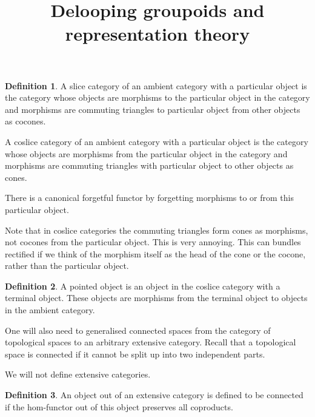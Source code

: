 \documentclass[10pt]{article}
\theoremstyle{plain}%
\theoremstyle{definition}
\newtheorem{definition}{Definition}[section]
\theoremstyle{remark}
\begin{document}
\title{Delooping groupoids and representation theory}

\maketitle

\begin{definition}
	A slice category of an ambient category with a particular object is the category whose objects are morphisms to the particular object in the category and morphisms are commuting triangles to particular object from other objects as cocones.

	A coslice category of an ambient category with a particular object is the category whose objects are morphisms from the particular object in the category and morphisms are commuting triangles with particular object to other objects as cones.

	There is a canonical forgetful functor by forgetting morphisms to or from this particular object.
\end{definition}

Note that in coslice categories the commuting triangles form cones as morphisms, not cocones from the particular object. This is very annoying.
This can bundles rectified if we think of the morphism itself as the head of the cone or the cocone, rather than the particular object.

\begin{definition}
	A pointed object is an object in the coslice category with a terminal object. These objects are morphisms from the terminal object to objects in the ambient category.
\end{definition}

One will also need to generalised connected spaces from the category of topological spaces to an arbitrary extensive category. Recall that a topological space is connected if it cannot be split up into two independent parts.

We will not define extensive categories.

\begin{definition}
	An object out of an extensive category is defined to be connected if the hom-functor out of this object preserves all coproducts.
\end{definition}
\end{document}
